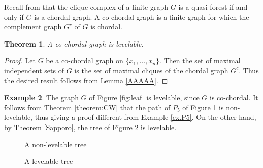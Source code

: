 \documentclass[12pt]{amsart}
\numberwithin{equation}{section}
\newtheorem{theorem}{Theorem}[section]
\theoremstyle{definition}
\newtheorem{example}[theorem]{Example}
\newcounter{i} %
\begin{document}
Recall from \cite[Theorem 9.2.12]{HHgtm260} that the clique complex of a finite graph $G$ is a quasi-forest 
if and only if $G$ is a chordal graph.  A co-chordal
graph is a finite graph for which the complement 
graph $G^c$ of $G$ is chordal.  

\begin{theorem}\label{thm.cochordal}
A co-chordal graph is levelable.   
\end{theorem}

\begin{proof}
Let $G$ be a co-chordal graph on $\{x_1, \ldots, x_n\}$.  Then the set of maximal independent sets of $G$ is the set of maximal cliques of the chordal graph $G^c$.  Thus the desired result follows from Lemma \ref{AAAAA}.
 \end{proof}


\begin{example}
The graph $G$ of Figure \ref{fig:leaf} is levelable, since $G$ is co-chordal.  It follows from Theorem \ref{theorem:CW} that the path of $P_5$ of Figure \ref{fig:treeA} is non-levelable, thus
giving a proof different from Example \ref{ex.P5}. On the other hand, by Theorem \ref{Sapporo}, the tree of Figure \ref{fig:treeB} is levelable.
\end{example}
\begin{figure}[h]
\centering
{}
\caption{A non-levelable tree} \label{fig:treeA}
\end{figure} 
\begin{figure}[h]
\centering
{}
\caption{A levelable tree} \label{fig:treeB}
\end{figure} 
\end{document}
